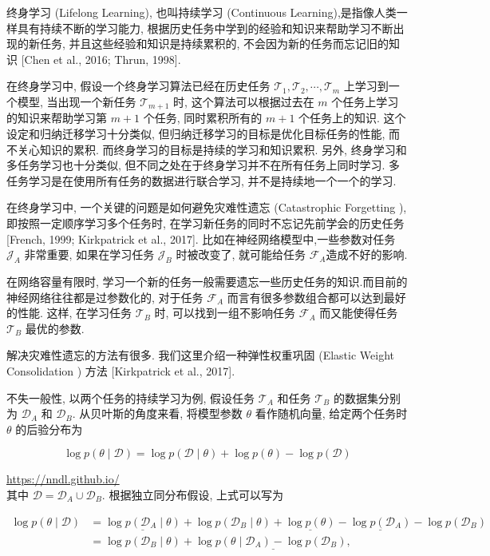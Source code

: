 \documentclass[10pt]{article}
\begin{document}
终身学习 (Lifelong Learning), 也叫持续学习 (Continuous Learning),是指像人类一样具有持续不断的学习能力, 根据历史任务中学到的经验和知识来帮助学习不断出现的新任务, 并且这些经验和知识是持续累积的, 不会因为新的任务而忘记旧的知识 [Chen et al., 2016; Thrun, 1998].

在终身学习中, 假设一个终身学习算法已经在历史任务 $\mathcal{T}_{1}, \mathcal{T}_{2}, \cdots, \mathcal{T}_{m}$ 上学习到一个模型, 当出现一个新任务 $\mathcal{T}_{m+1}$ 时, 这个算法可以根据过去在 $m$ 个任务上学习的知识来帮助学习第 $m+1$ 个任务, 同时累积所有的 $m+1$ 个任务上的知识. 这个设定和归纳迁移学习十分类似, 但归纳迁移学习的目标是优化目标任务的性能, 而不关心知识的累积. 而终身学习的目标是持续的学习和知识累积. 另外, 终身学习和多任务学习也十分类似, 但不同之处在于终身学习并不在所有任务上同时学习. 多任务学习是在使用所有任务的数据进行联合学习, 并不是持续地一个一个的学习.

在终身学习中, 一个关键的问题是如何避免灾难性遗忘 (Catastrophic Forgetting ), 即按照一定顺序学习多个任务时, 在学习新任务的同时不忘记先前学会的历史任务 [French, 1999; Kirkpatrick et al., 2017]. 比如在神经网络模型中,一些参数对任务 $\mathcal{J}_{A}$ 非常重要, 如果在学习任务 $\mathcal{J}_{B}$ 时被改变了, 就可能给任务 $\mathcal{F}_{A}$造成不好的影响.

在网络容量有限时, 学习一个新的任务一般需要遗忘一些历史任务的知识.而目前的神经网络往往都是过参数化的, 对于任务 $\mathcal{F}_{A}$ 而言有很多参数组合都可以达到最好的性能. 这样, 在学习任务 $\mathcal{T}_{B}$ 时, 可以找到一组不影响任务 $\mathcal{F}_{A}$ 而又能使得任务 $\mathcal{T}_{B}$ 最优的参数.

解决灾难性遗忘的方法有很多. 我们这里介绍一种弹性权重巩固 (Elastic Weight Consolidation ) 方法 [Kirkpatrick et al., 2017].

不失一般性, 以两个任务的持续学习为例, 假设任务 $\mathcal{T}_{A}$ 和任务 $\mathcal{T}_{B}$ 的数据集分别为 $\mathcal{D}_{A}$ 和 $\mathcal{D}_{B}$. 从贝叶斯的角度来看, 将模型参数 $\theta$ 看作随机向量, 给定两个任务时 $\theta$ 的后验分布为


\begin{equation*}
\log p(\theta \mid \mathcal{D})=\log p(\mathcal{D} \mid \theta)+\log p(\theta)-\log p(\mathcal{D}) \tag{10.36}
\end{equation*}


\href{https://nndl.github.io/}{https://nndl.github.io/}\\
其中 $\mathcal{D}=\mathcal{D}_{A} \cup \mathcal{D}_{B}$. 根据独立同分布假设, 上式可以写为


\begin{align*}
\log p(\theta \mid \mathcal{D}) & =\underline{\log p\left(\mathcal{D}_{A} \mid \theta\right)}+\log p\left(\mathcal{D}_{B} \mid \theta\right)+\underline{\log p(\theta)}-\underline{\log p\left(\mathcal{D}_{A}\right)}-\log p\left(\mathcal{D}_{B}\right)  \tag{10.37}\\
& =\log p\left(\mathcal{D}_{B} \mid \theta\right)+\underline{\log p\left(\theta \mid \mathcal{D}_{A}\right)-\log p\left(\mathcal{D}_{B}\right),} \tag{10.38}
\end{align*}
\end{document}
